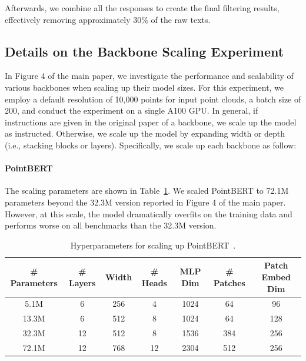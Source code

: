 Afterwards, we combine all the responses to create the final filtering results, effectively removing approximately 30\% of the raw texts.

\subsection{Details on the Backbone Scaling Experiment}

In Figure 4 of the main paper, we investigate the performance and scalability of various backbones when scaling up their model sizes. For this experiment, we employ a default resolution of 10,000 points for input point clouds, a batch size of 200, and conduct the experiment on a single A100 GPU. In general, if instructions are given in the original paper of a backbone, we scale up the model as instructed. Otherwise, we scale up the model by expanding width or depth (i.e., stacking blocks or layers). Specifically, we scale up each backbone as follow:

\paragraph{PointBERT~\cite{yu2021pointbert}} The scaling parameters are shown in Table~\ref{tab:pbertscl}. We scaled PointBERT to 72.1M parameters beyond the 32.3M version reported in Figure 4 of the main paper. However, at this scale, the model dramatically overfits on the training data and performs worse on all benchmarks than the 32.3M version.

\begin{table}[h]
\centering
\caption{Hyperparameters for scaling up PointBERT~\cite{yu2021pointbert}.}
\label{tab:pbertscl}
\begin{tabular}{ccccccc}
\toprule
\# Parameters & \# Layers & Width & \# Heads & MLP Dim & \# Patches & Patch Embed Dim  \\ 
\midrule
5.1M          & 6         & 256   & 4        & 1024    & 64         & 96                   \\
13.3M         & 6         & 512   & 8        & 1024    & 64         & 128                  \\
32.3M         & 12        & 512   & 8        & 1536    & 384        & 256                  \\
\color{gray}72.1M         & \color{gray}12        & \color{gray}768   & \color{gray}12        & \color{gray}2304    & \color{gray}512        & \color{gray}256                  \\
\bottomrule
\end{tabular}
\end{table}

